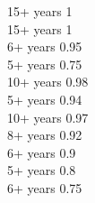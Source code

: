 
 {15+ years} {1} \\[-3pt]
 {15+ years} {1} \\[-2pt]
 {6+ years} {0.95} \\[-2pt]
 {5+ years} {0.75} \\[-2pt]
 {10+ years} {0.98} \\[-2pt]
 {5+ years} {0.94} \\[-2pt]
 {10+ years} {0.97} \\[-2pt]
 {8+ years} {0.92} \\[-2pt]
 {6+ years} {0.9} \\[-2pt]
 {5+ years} {0.8} \\[-2pt]
 {6+ years} {0.75} \\[-2pt]
